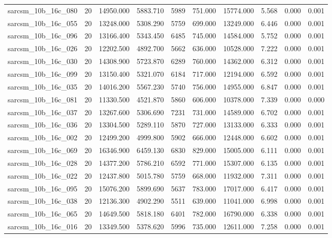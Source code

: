 \begin{tabular}{lrrrrrrrrr}
sarcsm\_10b\_16c\_080 & 20 & 14950.000 & 5883.710 & 5989 & 751.000 & 15774.000 & 5.568 & 0.000 & 0.001 \\
sarcsm\_10b\_16c\_055 & 20 & 13248.000 & 5308.290 & 5759 & 699.000 & 13249.000 & 6.446 & 0.000 & 0.001 \\
sarcsm\_10b\_16c\_096 & 20 & 13166.400 & 5343.450 & 6485 & 745.000 & 14584.000 & 5.752 & 0.000 & 0.001 \\
sarcsm\_10b\_16c\_026 & 20 & 12202.500 & 4892.700 & 5662 & 636.000 & 10528.000 & 7.222 & 0.000 & 0.001 \\
sarcsm\_10b\_16c\_030 & 20 & 14308.900 & 5723.870 & 6289 & 760.000 & 14362.000 & 6.312 & 0.000 & 0.001 \\
sarcsm\_10b\_16c\_099 & 20 & 13150.400 & 5321.070 & 6184 & 717.000 & 12194.000 & 6.592 & 0.000 & 0.001 \\
sarcsm\_10b\_16c\_035 & 20 & 14016.200 & 5567.230 & 5740 & 756.000 & 14955.000 & 6.847 & 0.000 & 0.001 \\
sarcsm\_10b\_16c\_081 & 20 & 11330.500 & 4521.870 & 5860 & 606.000 & 10378.000 & 7.339 & 0.000 & 0.000 \\
sarcsm\_10b\_16c\_037 & 20 & 13267.600 & 5306.690 & 7231 & 731.000 & 14589.000 & 6.702 & 0.000 & 0.001 \\
sarcsm\_10b\_16c\_036 & 20 & 13304.500 & 5289.110 & 5870 & 727.000 & 13133.000 & 6.333 & 0.000 & 0.001 \\
sarcsm\_10b\_16c\_002 & 20 & 12499.200 & 4999.800 & 5902 & 666.000 & 12448.000 & 6.602 & 0.000 & 0.001 \\
sarcsm\_10b\_16c\_069 & 20 & 16346.900 & 6459.130 & 6830 & 829.000 & 15005.000 & 6.111 & 0.000 & 0.001 \\
sarcsm\_10b\_16c\_028 & 20 & 14377.200 & 5786.210 & 6592 & 771.000 & 15307.000 & 6.135 & 0.000 & 0.001 \\
sarcsm\_10b\_16c\_022 & 20 & 12437.800 & 5015.780 & 5759 & 668.000 & 11932.000 & 7.311 & 0.000 & 0.001 \\
sarcsm\_10b\_16c\_095 & 20 & 15076.200 & 5899.690 & 5637 & 783.000 & 17017.000 & 6.417 & 0.000 & 0.001 \\
sarcsm\_10b\_16c\_038 & 20 & 12136.300 & 4902.290 & 5511 & 639.000 & 11041.000 & 6.998 & 0.000 & 0.001 \\
sarcsm\_10b\_16c\_065 & 20 & 14649.500 & 5818.180 & 6401 & 782.000 & 16790.000 & 6.338 & 0.000 & 0.001 \\
sarcsm\_10b\_16c\_016 & 20 & 13349.500 & 5378.620 & 5996 & 735.000 & 12611.000 & 7.258 & 0.000 & 0.001 \\

\end{tabular}
